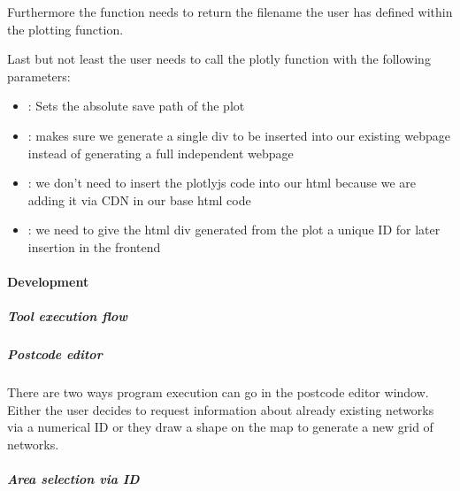 \documentclass[letterpaper,10pt,english]{sphinxmanual}
\begin{document}
\begin{DUlineblock}{0em}
\item[] Furthermore the function needs to return the filename the user has defined within the plotting function.
\item[] Last but not least the user needs to call the plotly  function with the following parameters:
\end{DUlineblock}
\begin{itemize}
\item {} 
\sphinxAtStartPar
{}: Sets the absolute save path of the plot

\item {} 
\sphinxAtStartPar
{}: makes sure we generate a single div to be inserted into our existing webpage instead of generating a full independent webpage

\item {} 
\sphinxAtStartPar
{}: we don’t need to insert the plotlyjs code into our html because we are adding it via CDN in our base html code

\item {} 
\sphinxAtStartPar
{}: we need to give the html div generated from the plot a unique ID for later insertion in the frontend

\end{itemize}

\sphinxstepscope


\paragraph{Development}
\label{\detokenize{docs_gui/dev/development:development}}\label{\detokenize{docs_gui/dev/development::doc}}

\subparagraph{Tool execution flow}
\label{\detokenize{docs_gui/dev/development:tool-execution-flow}}

\subparagraph{Postcode editor}
\label{\detokenize{docs_gui/dev/development:postcode-editor}}
\sphinxAtStartPar
There are two ways program execution can go in the postcode editor window. Either the user decides to request information about already
existing networks via a numerical ID or they draw a shape on the map to generate a new grid of networks.


\subparagraph{Area selection via ID}
\label{\detokenize{docs_gui/dev/development:area-selection-via-id}}
\noindent{}
\end{document}
